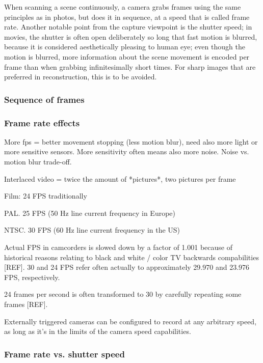 When scanning a scene continuously, a camera grabs frames using the same principles as in photos, but does it in sequence, at a speed that is called frame rate.
Another notable point from the capture viewpoint is the shutter speed; in movies, the shutter is often open deliberately so long that fast motion is blurred, because it is considered aesthetically pleasing to human eye; even though the motion is blurred, more information about the scene movement is encoded per frame than when grabbing infinitesimally short times.
\cite{wilson2004anton}
For sharp images that are preferred in reconstruction, this is to be avoided.


\subsubsection{Sequence of frames} %



\subsubsection{Frame rate effects} %

More fps = better movement stopping (less motion blur), need also more light or more sensitive sensors. More sensitivity often means also more noise. Noise vs. motion blur trade-off.

Interlaced video = twice the amount of *pictures*, two pictures per frame

Film: 24 FPS traditionally

PAL. 25 FPS (50 Hz line current frequency in Europe)

NTSC. 30 FPS (60 Hz line current frequency in the US)

Actual FPS in camcorders is slowed down by a factor of 1.001 because of historical reasons relating to black and white / color TV backwards compabilities [REF].
30 and 24 FPS refer often actually to approximately 29.970 and 23.976 FPS, respectively.

24 frames per second is often transformed to 30 by carefully repeating some frames [REF].

Externally triggered cameras can be configured to record at any arbitrary speed, as long as it's in the limits of the camera speed capabilities.


\subsubsection{Frame rate vs. shutter speed} %

